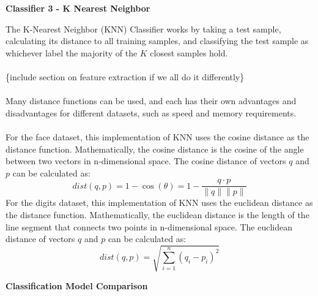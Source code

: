 \documentclass[11pt]{article}
\begin{document}
    \begin{center}
        \Large
        \textbf{Classifier 3 - K Nearest Neighbor}
    \end{center}
    \normalsize
    The K-Nearest Neighbor (KNN) Classifier works by taking a test sample, calculating its
    distance to all training samples, and classifying the test sample as whichever label
    the majority of the $K$ closest samples hold.\\\\
    \{include section on feature extraction if we all do it differently\}\\\\
    Many distance functions can be used, and each has their own advantages and disadvantages for
    different datasets, such as speed and memory requirements.\\\\
    For the face dataset, this implementation of KNN uses the cosine distance as the distance function.
    Mathematically, the cosine distance is the cosine of the angle between two vectors in n-dimensional space.
    The cosine distance of vectors $q$ and $p$ can be calculated as:
    \[dist\left(q, p\right) = 1-\cos(\theta) = 1-\frac{q \cdot p}{\|q\|\|p\|}\]
    For the digits dataset, this implementation of KNN uses the euclidean distance as the distance function.
    Mathematically, the euclidean distance is the length of the line segment that connects two points in n-dimensional space.
    The euclidean distance of vectors $q$ and $p$ can be calculated as:
    \[dist\left(q, p\right) = \sqrt{\sum_{i=1}^{n}\left(q_i-p_i\right)^2}\]

    \begin{center}
        \Large
        \textbf{Classification Model Comparison}
    \end{center}
    \normalsize
\end{document}
